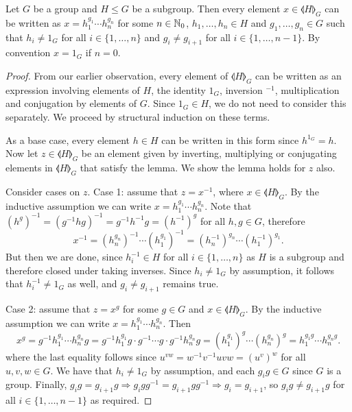 \begin{lemma}%
  \label{lem:normal_closure_elements}
  Let $G$ be a group and $H\leq G$ be a subgroup. Then every element $x\in \llangle H\rrangle_G$ can be written as
  $x = h_1^{g_1} \cdots h_n^{g_n}$ for some $n\in \mathbb{N}_0$, $h_1,\ldots, h_n \in H$ and $g_1,\ldots, g_n\in G$ such that
  $h_i\neq 1_G$ for all $i\in \{1, \ldots, n\}$ and $g_i\neq g_{i+1}$ for all
  $i\in \{1,\ldots, n-1\}$. By convention $x = 1_G$ if $n = 0$.
\end{lemma}
\begin{proof}
  From our earlier observation, every element of $\llangle H \rrangle_G$ can be written as an
  expression involving elements of $H$, the identity $1_G$, inversion $^{-1}$, multiplication and
  conjugation by elements of $G$. Since $1_G \in H$, we do not need to consider this separately.
  We proceed by structural induction on these terms.

  As a base case, every element $h\in H$ can be written in this form since $h^{1_G} = h$.
  Now let $z\in \llangle H\rrangle_G$ be an element given by inverting, multiplying or
  conjugating elements in $\llangle H \rrangle_G$ that satisfy the lemma. We show the lemma holds for $z$ also.

  Consider cases on $z$. Case 1: assume that $z = x^{-1}$, where $x\in \llangle H \rrangle_G$. By
  the inductive assumption we can write $x = h_1^{g_1} \cdots h_n^{g_n}$. Note that
  ${\left(h^g\right)}^{-1} = {\left(g^{-1}hg\right)}^{-1} = g^{-1}h^{-1}g = {\left(h^{-1}\right)}^g$
  for all $h, g\in G$, therefore
  \[
    x^{-1} = {\left(h_n^{g_n}\right)}^{-1} \cdots {\left(h_1^{g_1}\right)}^{-1} =
    {\left(h_n^{-1}\right)}^{g_n} \cdots {\left(h_1^{-1}\right)}^{g_1}.
  \]
  But then we are done, since $h_i^{-1}\in H$ for all $i\in \{1, \ldots, n\}$ as $H$ is a
  subgroup and therefore closed under taking inverses. Since $h_i\neq 1_G$ by assumption, it
  follows that $h_i^{-1}\neq 1_G$ as well, and $g_i \neq g_{i+1}$ remains true.

  Case 2: assume that $z = x^{g}$ for some $g\in G$ and $x\in \llangle H \rrangle_G$.
  By the inductive assumption we can write $x = h_1^{g_1} \cdots h_n^{g_n}$. Then
  \[
    x^{g} = g^{-1}h_1^{g_1} \cdots h_n^{g_n}g =
    g^{-1}h_1^{g_1} g \cdot  g^{-1}\cdots g \cdot g^{-1} h_n^{g_n}g =
    {\left(h_1^{g_1}\right)}^{g} \cdots {\left(h_n^{g_n}\right)}^{g} =
    h_1^{g_1 g} \cdots h_n^{g_n g}.
  \]
  where the last equality follows since $u^{vw} = w^{-1}v^{-1} u vw = {\left(u^v\right)}^w$ for all
  $u, v, w\in G$. We have that $h_i \neq 1_G$ by assumption, and each
  $g_i g \in G$ since $G$ is a group. Finally,
  $g_i g = g_{i+1} g \Rightarrow g_i g g^{-1} = g_{i+1}gg^{-1}\Rightarrow g_i = g_{i+1}$,
  so $g_i g \neq g_{i+1}g$  for all $i\in \{1, \ldots, n-1\}$ as required.


\end{proof}
